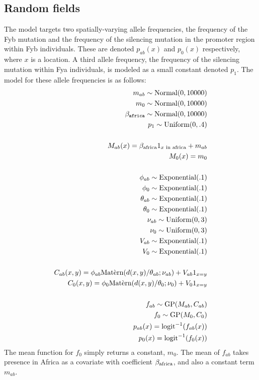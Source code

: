 \documentclass[a4paper]{article}
\begin{document}
\subsection{Random fields}
The model targets two spatially-varying allele frequencies, the frequency of the Fyb mutation and the frequency of the silencing mutation in the promoter region within Fyb individuals. These are denoted $p_{ab}(x)$ and $p_0(x)$ respectively, where $x$ is a location. A third allele frequency, the frequency of the silencing mutation within Fya individuals, is modeled as a small constant denoted $p_1$. The model for these allele frequencies is as follows:
\begin{eqnarray*}
    m_{ab} \sim \textup{Normal}(0,10000) \\
    m_0 \sim \textup{Normal}(0,10000)\\
    \beta_{\mathtt{africa}} \sim \textup{Normal}(0,10000)\\
    p_1\sim\textup{Uniform}(0,.4)\\
    \\
    M_{ab}(x) = \beta_{\textup{africa}} 1_{x\textup{\ in\ africa}} + m_{ab}\\
    M_0(x) = m_0\\
    \\
    \phi_{ab}\sim\textup{Exponential}(.1)\\
    \phi_{0}\sim\textup{Exponential}(.1)\\
    \theta_{ab}\sim\textup{Exponential}(.1)\\
    \theta_{0}\sim\textup{Exponential}(.1)\\
    \nu_{ab}\sim\textup{Uniform}(0,3)\\
    \nu_{0}\sim\textup{Uniform}(0,3)\\
    V_{ab}\sim\textup{Exponential}(.1)\\
    V_0\sim\textup{Exponential}(.1)\\
    \\
    C_{ab}(x,y) = \phi_{ab}\textup{Mat\`ern}(d(x,y)/\theta_{ab};\nu_{ab})+V_{ab}1_{x=y}\\
    C_{0}(x,y) = \phi_{0}\textup{Mat\`ern}(d(x,y)/\theta_{0};\nu_{0})+V_{0}1_{x=y}\\
    \\
    f_{ab}\sim\textup{GP}(M_{ab},C_{ab})\\
    f_{0}\sim\textup{GP}(M_{0},C_{0})\\
    p_{ab}(x)=\textup{logit}^{-1}(f_{ab}(x)) \\
    p_{0}(x)=\textup{logit}^{-1}(f_{0}(x))     
\end{eqnarray*}
The mean function for $f_0$ simply returns a constant, $m_0$. The mean of $f_{ab}$ takes presence in Africa as a covariate with coefficient $\beta_{\textup{africa}}$, and also a constant term $m_{ab}$. 
\end{document}
